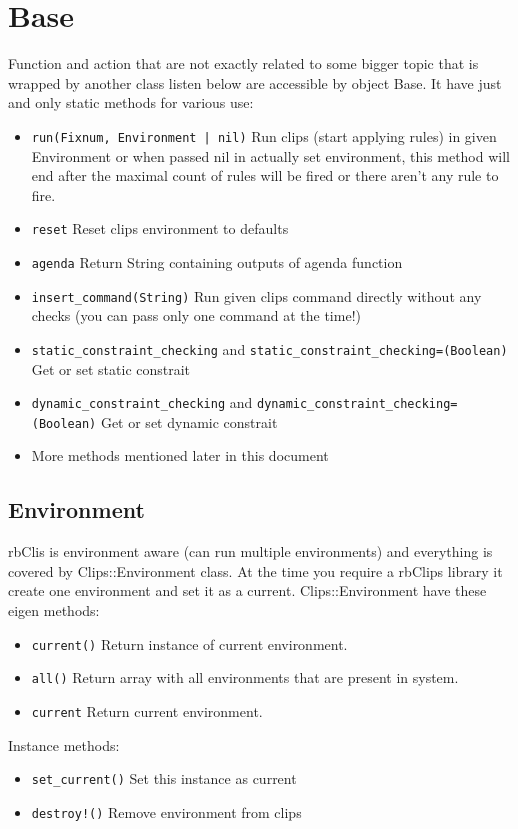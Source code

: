 \documentclass[a4paper,10pt]{article}
\begin{document}
\section{Base}
Function and action that are not exactly related to some bigger topic that is wrapped by another class listen below are accessible by object Base. It have just and only static methods for various use:
\begin{itemize}
 \item \texttt{run(Fixnum, Environment | nil)} Run clips (start applying rules) in given Environment or when passed nil in actually set environment, this method will end after the maximal count of rules will be fired or there aren't any rule to fire.
 \item \texttt{reset} Reset clips environment to defaults
 \item \texttt{agenda} Return String containing outputs of agenda function
 \item \texttt{insert\_command(String)} Run given clips command directly without any checks (you can pass only one command at the time!)
 \item \texttt{static\_constraint\_checking} and \texttt{static\_constraint\_checking=(Boolean)} Get or set static constrait
 \item \texttt{dynamic\_constraint\_checking} and \texttt{dynamic\_constraint\_checking=(Boolean)} Get or set dynamic constrait
 \item More methods mentioned later in this document
\end{itemize}

\subsection{Environment}
rbClis is environment aware (can run multiple environments) and everything is covered by Clips::Environment class. At the time you require a rbClips library it create one environment and set it as a current. Clips::Environment have these eigen methods:
\begin{itemize}
 \item \texttt{current()} Return instance of current environment.
 \item \texttt{all()} Return array with all environments that are present in system.
 \item \texttt{current} Return current environment.
\end{itemize}

Instance methods:
\begin{itemize}
 \item \texttt{set\_current()} Set this instance as current
 \item \texttt{destroy!()} Remove environment from clips
\end{itemize}
\end{document}
